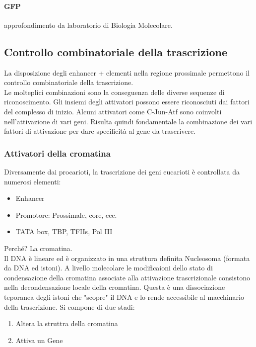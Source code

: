 \documentclass{article}
\begin{document}
\paragraph{GFP} approfondimento da laboratorio di Biologia Molecolare.
\subsection{Controllo combinatoriale della trascrizione}
La disposizione degli enhancer + elementi nella regione prossimale permettono il controllo combinatoriale della trascrizione.\\
Le molteplici combinazioni sono la conseguenza delle diverse sequenze di riconoscimento. Gli insiemi degli attivatori possono essere riconosciuti dai fattori del complesso di inizio. Alcuni attivatori come C-Jun-Atf
sono coinvolti nell'attivazione di vari geni. Risulta quindi fondamentale la
combinazione dei vari fattori di attivazione per dare specificità al gene da trascrivere.
\subsubsection{Attivatori della cromatina}
Diversamente dai procarioti, la trascrizione dei geni eucarioti è controllata da numerosi elementi:
\begin{itemize}
    \item Enhancer
    \item Promotore: Prossimale, core, ecc.
    \item TATA box, TBP, TFIIs, Pol III
\end{itemize}
Perché? La cromatina.\\
Il DNA è lineare ed è organizzato in una struttura definita Nucleosoma (formata da DNA ed istoni). A livello molecolare le modificaioni dello stato di condensazione della cromatina associate alla attivazione trascrizionale consistono nella decondensazione locale
della cromatina. Questa è una dissociazione teporanea degli istoni che "scopre" il DNA e lo rende accessibile al macchinario della trascrizione. Si compone di due stadi:
\begin{enumerate}
    \item Altera la struttra della cromatina
    \item Attiva un Gene
\end{enumerate}
\end{document}
